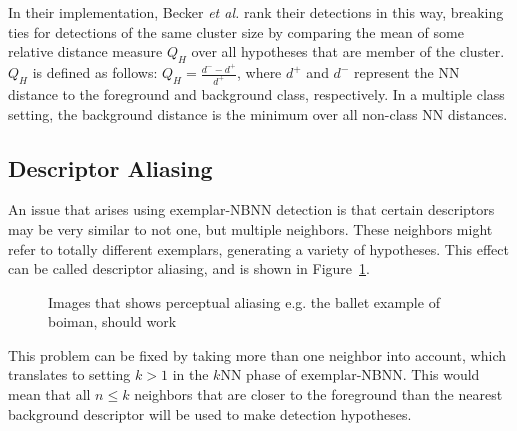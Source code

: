 In their implementation, Becker \emph{et al.} \cite{becker2012codebook} rank their detections in this way, breaking ties for detections of the same cluster size by comparing the mean of some relative distance measure $Q_H$ over all hypotheses that are member of the cluster. $Q_H$ is defined as follows: $Q_H=\frac{d^- - d^+}{d^+}$, where $d^+$ and $d^-$ represent the NN distance to the foreground and background class, respectively. In a multiple class setting, the background distance is the minimum over all non-class NN distances.

\subsection{Descriptor Aliasing} %
\label{sec:descriptor_aliasing}

An issue that arises using exemplar-NBNN detection is that certain descriptors may be very similar to not one, but multiple neighbors. These neighbors might refer to totally different exemplars, generating a variety of hypotheses. This effect can be called descriptor aliasing, and is shown in Figure~\ref{fig:aliasing}.



\begin{figure}[hbt]
    \centering
    \caption{Images that shows perceptual aliasing e.g. the ballet example of boiman, should work}
    \label{fig:aliasing}
\end{figure}

This problem can be fixed by taking more than one neighbor into account, which translates to setting $k>1$ in the $k$NN phase of exemplar-NBNN. This would mean that all $n\leq k$ neighbors that are closer to the foreground than the nearest background descriptor will be used to make detection hypotheses.


